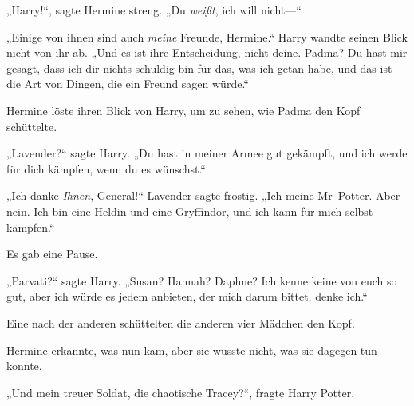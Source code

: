 „Harry!“, sagte Hermine streng. „Du \emph{weißt}, ich will nicht—“

„Einige von ihnen sind auch \emph{meine} Freunde, Hermine.“ Harry wandte seinen Blick nicht von ihr ab. „Und es ist ihre Entscheidung, nicht deine. Padma? Du hast mir gesagt, dass ich dir nichts schuldig bin für das, was ich getan habe, und das ist die Art von Dingen, die ein Freund sagen würde.“

Hermine löste ihren Blick von Harry, um zu sehen, wie Padma den Kopf schüttelte.

„Lavender?“ sagte Harry. „Du hast in meiner Armee gut gekämpft, und ich werde für dich kämpfen, wenn du es wünschst.“

„Ich danke \emph{Ihnen}, General!“ Lavender sagte frostig. „Ich meine Mr~Potter. Aber nein. Ich bin eine Heldin und eine Gryffindor, und ich kann für mich selbst kämpfen.“

Es gab eine Pause.

„Parvati?“ sagte Harry. „Susan? Hannah? Daphne? Ich kenne keine von euch so gut, aber ich würde es jedem anbieten, der mich darum bittet, denke ich.“

Eine nach der anderen schüttelten die anderen vier Mädchen den Kopf.

Hermine erkannte, was nun kam, aber sie wusste nicht, was sie dagegen tun konnte.

„Und mein treuer Soldat, die chaotische Tracey?“, fragte Harry Potter.

